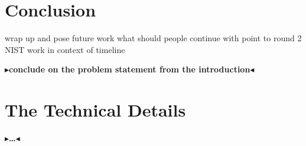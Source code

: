 \documentclass[twoside,11pt,openright]{report}
\theoremstyle{definition}
\theoremstyle{plain}
\newcommand{\todo}[1]{{\color[rgb]{.5,0,0}\textbf{$\blacktriangleright$#1$\blacktriangleleft$}}}
\begin{document}

\chapter{Conclusion}
\label{ch:conclusion}

wrap up and pose future work
what should people continue with
point to round 2 NIST
work in context of timeline

\todo{conclude on the problem statement from the introduction}


\cleardoublepage
{}




\cleardoublepage
\appendix
\chapter{The Technical Details}

\todo{\dots}
\end{document}
